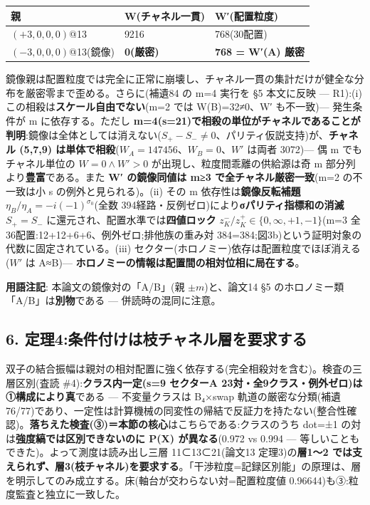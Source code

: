 \documentclass[
]{ltjsarticle}
\newcounter{none} %
\begin{document}
{\def\LTcaptype{none} %
\begin{longtable}[]{@{}lll@{}}
\toprule\noalign{}
親 & W(チャネル一貫) & W′(配置粒度) \\
\midrule\noalign{}
\endhead
\bottomrule\noalign{}
\endlastfoot
\((+3,0,0,0)\)@13 & 9216 & 768(30配置) \\
\((-3,0,0,0)\)@13(鏡像) & \textbf{0(厳密)} & \textbf{768 = W′(A)
厳密} \\
\end{longtable}
}

鏡像親は配置粒度では完全に正常に崩壊し、チャネル一貫の集計だけが健全な分布を厳密零まで歪める。さらに(補遺84
の m=4 実行を §5 本文に反映 --- R1):(i)
この相殺は\textbf{スケール自由でない}(m=2 では W(B)=32≠0、W′
も不一致)--- 発生条件が m に依存する。ただし
\textbf{m=4(s=21)で相殺の単位がチャネルであることが判明}:鏡像は全体としては消えない(\(S_+-S_-\neq0\)、パリティ仮説支持)が、\textbf{チャネル
(5,7,9) は単体で相殺}(\(W_A=147456\)、\(W_B=0\)、\(W'\) は両者 3072)---
偶 m でもチャネル単位の \(W=0\wedge W'>0\)
が出現し、粒度間乖離の供給源は奇 m 部分列より\textbf{豊富}である。また
\textbf{W′ の鏡像同値は m≥3 で全チャネル厳密一致}(m=2 の不一致は小 s
の例外と見られる)。(ii) その m 依存性は\textbf{鏡像反転補題}
\(\eta_B/\eta_A=-i(-1)^{\sigma_0}\)(全数
394経路・反例ゼロ)により\textbf{σパリティ指標和の消滅} \(S_+=S_-\)
に還元され、配置水準では\textbf{四値ロック}
\(z^-_K/z^+_K\in\{0,\infty,+1,-1\}\)(m=3
全36配置:12+12+6+6、例外ゼロ;排他族の重み対
384=384;図3b)という証明対象の代数に固定されている。(iii)
セクター(ホロノミー)依存は配置粒度でほぼ消える(\(W'\) は A≈B)---
\textbf{ホロノミーの情報は配置間の相対位相に局在する}。

\textbf{用語注記}: 本論文の鏡像対の「A/B」(親 \(\pm m\))と、論文14 §5
のホロノミー類「A/B」は\textbf{別物}である --- 併読時の混同に注意。

\subsection{6.
定理4:条件付けは枝チャネル層を要求する}\label{ux5b9aux74064ux6761ux4ef6ux4ed8ux3051ux306fux679dux30c1ux30e3ux30cdux30ebux5c64ux3092ux8981ux6c42ux3059ux308b}

双子の結合振幅は親対の相対配置に強く依存する(完全相殺対を含む)。検査の三層区別(査読
\#4):\textbf{クラス内一定(s=9 セクターA
23対・全9クラス・例外ゼロ)は①構成により真}である --- 不変量クラスは
B₄×swap
軌道の厳密な分類(補遺76/77)であり、一定性は計算機械の同変性の帰結で反証力を持たない(整合性確認)。\textbf{落ちえた検査(③)＝本節の核心}はこちらである:クラスのうち
dot=±1 の対は\textbf{強度縞では区別できないのに P(X) が異なる}(0.972 vs
0.994 --- 等しいこともできた)。よって測度は読み出し三層 11⊂13⊂21(論文13
定理3)の\textbf{層1〜2
では支えられず、層3(枝チャネル)を要求する}。「干渉粒度=記録区別能」の原理は、層を明示してのみ成立する。床(軸台が交わらない対=配置粒度値
0.96644)も③:粒度監査と独立に一致した。
\end{document}
